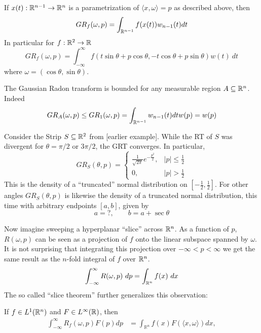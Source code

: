 \begin{myexample}
  If $x(t):\mathbb{R}^{n-1} \to \mathbb{R}^n$ is a parametrization of $\langle x, \omega\rangle = p$ as described above, then
  \[
    GR_f(\omega, p) = \int_{\mathbb{R}^{n-1}}f(x(t)) w_{n-1}(t) dt
  \]
  In particular for $f:\mathbb{R}^2 \to \mathbb{R}$
  \[
    GR_f(\omega, p) = \int_{-\infty}^\infty f(t \sin \theta + p \cos \theta, -t \cos \theta + p \sin \theta) w(t)~dt
  \]
  where $\omega = (\cos \theta, \sin \theta)$.
\end{myexample}

\begin{myexample}
  The Gaussian Radon transform is bounded for any measurable region $A \subseteq \mathbb{R}^n$. Indeed 
  \[
      GR_A(\omega, p) \leq GR_1(\omega, p) = \int_{\mathbb{R}^{n-1}} w_{n-1}(t)dt w(p) = w(p)
  \]
\end{myexample}

\begin{myexample}
  Consider the Strip $S \subseteq \mathbb{R}^2$ from [earlier example]. While the RT of $S$ was divergent for $\theta = \pi/2$ or $3\pi/2$, the GRT converges. In particular,
  \[
    GR_S(\theta, p)
    = \begin{cases}
      \frac1{\sqrt{2\pi}}e^{-\frac{p^2}2}, & |p| \leq \frac12 \\
      0, & |p| > \frac12
    \end{cases}
  \]
  This is the density of a ``truncated'' normal distribution on $[-\frac12,\frac12]$. For other angles $GR_S(\theta, p)$ is likewise the density of a truncated normal distribution, this time with arbitrary endpoints $[a, b]$, given by
  \[
    a = ?, \qquad b = a + \sec\theta
  \]
\end{myexample}

Now imagine sweeping a hyperplanar ``slice'' across $\mathbb{R}^n$. As a function of $p$, $R(\omega, p)$ can be seen as a projection of $f$ onto the linear subspace spanned by $\omega$. It is not surprising that integrating this projection over $-\infty < p < \infty$ we get the same result as the $n$-fold integral of $f$ over $\mathbb{R}^n$.
\[
    \int_{-\infty}^\infty R(\omega, p) ~dp = \int_{\mathbb{R}^n} f(x) ~dx
\]
The so called ``slice theorem'' further generalizes this observation:

\begin{proposition}[Slice Theorem]
  If $f \in L^1(\mathbb{R}^n)$ and $F \in L^\infty(\mathbb{R})$, then
  \begin{align}
    \label{eq:ST}
    \int_{-\infty}^\infty R_f(\omega, p) F(p) dp 
    &= \int_{\mathbb{R}^n} f(x) F(\langle x, \omega \rangle) dx,
  \end{align}
\end{proposition}

